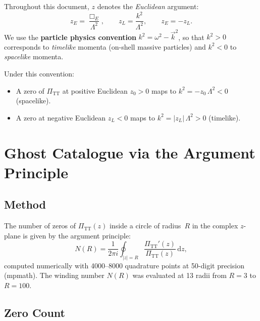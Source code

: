 \documentclass[11pt,a4paper]{article}
\newcommand{\dd}{\mathrm{d}}
\newcommand{\PiTT}{\Pi_{\mathrm{TT}}}
\begin{document}
Throughout this document, $z$ denotes the \emph{Euclidean} argument:
\begin{equation}\label{eq:wick}
  z_E = \frac{\Box_E}{\Lambda^2},
  \qquad
  z_L = \frac{k^2}{\Lambda^2},
  \qquad
  z_E = -z_L.
\end{equation}
We use the \textbf{particle physics convention} $k^2 = \omega^2 -
\vec{k}^2$, so that $k^2 > 0$ corresponds to \emph{timelike} momenta
(on-shell massive particles) and $k^2 < 0$ to \emph{spacelike} momenta.

Under this convention:
\begin{itemize}[nosep]
  \item A zero of $\PiTT$ at positive Euclidean $z_0 > 0$ maps to
    $k^2 = -z_0\,\Lambda^2 < 0$ (spacelike).
  \item A zero at negative Euclidean $z_L < 0$ maps to
    $k^2 = |z_L|\,\Lambda^2 > 0$ (timelike).
\end{itemize}


\section{Ghost Catalogue via the Argument Principle}
\label{sec:catalogue}

\subsection{Method}

The number of zeros of $\PiTT(z)$ inside a circle of radius~$R$ in the
complex $z$-plane is given by the argument principle:
\begin{equation}\label{eq:arg-principle}
  N(R)
  = \frac{1}{2\pi i}\oint_{|z|=R}
  \frac{\PiTT'(z)}{\PiTT(z)}\,\dd z,
\end{equation}
computed numerically with 4000--8000 quadrature points at 50-digit
precision (mpmath).  The winding number $N(R)$ was evaluated at 13 radii
from $R = 3$ to $R = 100$.

\subsection{Zero Count}
\end{document}

